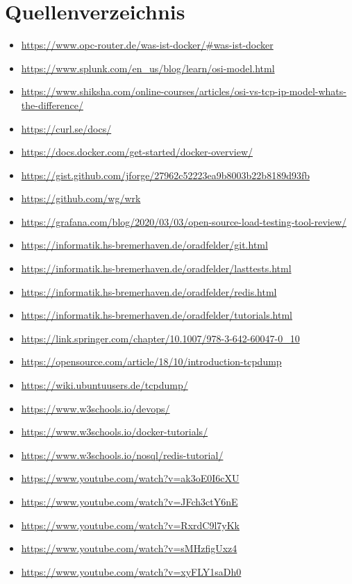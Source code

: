 \section {Quellenverzeichnis}
\begin{itemize}
    \item \url{https://www.opc-router.de/was-ist-docker/#was-ist-docker}
    \item \url{https://www.splunk.com/en_us/blog/learn/osi-model.html}
    \item \url{https://www.shiksha.com/online-courses/articles/osi-vs-tcp-ip-model-whats-the-difference/}
    \item \url{https://curl.se/docs/}
    \item \url{https://docs.docker.com/get-started/docker-overview/}
    \item \url{https://gist.github.com/jforge/27962c52223ea9b8003b22b8189d93fb}
    \item \url{https://github.com/wg/wrk}
    \item \url{https://grafana.com/blog/2020/03/03/open-source-load-testing-tool-review/}
    \item \url{https://informatik.hs-bremerhaven.de/oradfelder/git.html}
    \item \url{https://informatik.hs-bremerhaven.de/oradfelder/lasttests.html}
    \item \url{https://informatik.hs-bremerhaven.de/oradfelder/redis.html}
    \item \url{https://informatik.hs-bremerhaven.de/oradfelder/tutorials.html}
    \item \url{https://link.springer.com/chapter/10.1007/978-3-642-60047-0_10}
    \item \url{https://opensource.com/article/18/10/introduction-tcpdump}
    \item \url{https://wiki.ubuntuusers.de/tcpdump/}
    \item \url{https://www.w3schools.io/devops/}
    \item \url{https://www.w3schools.io/docker-tutorials/}
    \item \url{https://www.w3schools.io/nosql/redis-tutorial/}
    \item \url{https://www.youtube.com/watch?v=ak3oE0I6cXU}
    \item \url{https://www.youtube.com/watch?v=JFch3ctY6nE}
    \item \url{https://www.youtube.com/watch?v=RxrdC9l7yKk}
    \item \url{https://www.youtube.com/watch?v=sMHzfigUxz4}
    \item \url{https://www.youtube.com/watch?v=xyFLY1saDh0}
    
\end{itemize}
